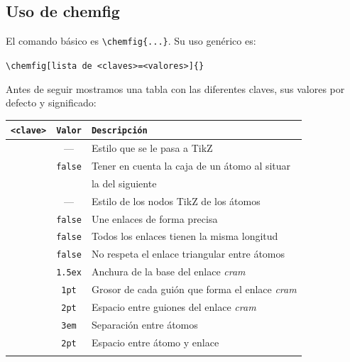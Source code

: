 \subsection{Uso de \textsf{chemfig}}
El comando básico es \texttt{\textbackslash chemfig\{...\}}.
Su uso genérico es:
\begin{center}
\texttt{\textbackslash chemfig[lista de <claves>=<valores>]\{<código de la molécula>\}}
\end{center}

Antes de seguir mostramos una tabla con las diferentes claves, sus valores por defecto y
significado:
{\small
\begin{center}
  \begin{longtable}{rcl}\hline
    \label{tbl:chemfig_claves}
    \texttt{<clave>} & \texttt{Valor} & \texttt{Descripción}\\\hline
    \texttt{\color{Blue}{chemfig style}}
    & ---
    & Estilo que se le pasa a \textsf{TikZ}\\
    \texttt{\color{Blue}{use atom strut}}
    & \texttt{false}
    & Tener en cuenta la caja de un átomo al situar\\&& la del siguiente\\
    \texttt{\color{Blue}{atom style}}
    & ---
    & Estilo de los nodos \textsf{TikZ} de los átomos\\
    \texttt{\color{Blue}{bond join}}
    & \texttt{false}
    & Une enlaces de forma precisa\\
    \texttt{\color{Blue}{fixed length}}
    & \texttt{false}
    & Todos los enlaces tienen la misma longitud\\
    \texttt{\color{Blue}{cram rectangle}}
    & \texttt{false}
    & No respeta el enlace triangular entre átomos\\
    \texttt{\color{Blue}{cram width}}
    & \texttt{1.5ex}
    & Anchura de la base del enlace \emph{cram}\\
    \texttt{\color{Blue}{cram dash width}}
    & \texttt{1pt}
    & Grosor de cada guión que forma el enlace \emph{cram}\\
    \texttt{\color{Blue}{cram dash sep}}
    & \texttt{2pt}
    & Espacio entre guiones del enlace \emph{cram}\\
    \texttt{\color{Blue}{atom sep}}
    & \texttt{3em}
    & Separación entre átomos\\
    \texttt{\color{Blue}{bond offset}}
    & \texttt{2pt}
    & Espacio entre átomo y enlace\\
    \texttt{\color{Blue}{double bond sep}}

\end{longtable}
\end{center}}
